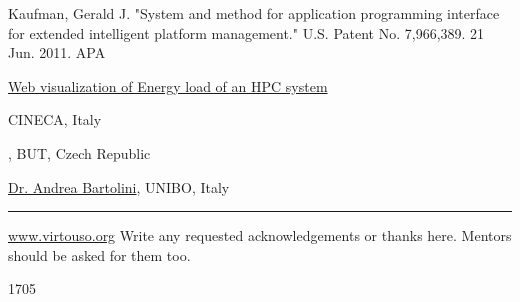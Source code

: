 \documentclass[a4paper, twoside]{article}
\begin{document}
\begin{multicols}{3}
\begin{thebibliography}{9}
Kaufman, Gerald J. "System and method for application programming interface for extended intelligent platform management." U.S. Patent No. 7,966,389. 21 Jun. 2011.
APA
\end{thebibliography}

\vfill
\noindent\begin{minipage}[b]{0.7\linewidth}
\begin{flushleft}
  \selectfont
  \href{https://summerofhpc.prace-ri.eu/web-visualization-of-energy-load-of-an-hpc-system/}{Web visualization of Energy load of an HPC system}
  
  CINECA, Italy
  
  \href{mailto:xstehl14@stud.fit.vutbr.cz}{\theauthor},
  BUT, Czech Republic
  
  \href{mailto:a.bartolini@unibo.it}{Dr. Andrea Bartolini}, UNIBO, Italy
\end{flushleft}
\end{minipage}\hfill%
\begin{minipage}[b]{0.3\linewidth}
  \color{prace-darkblue}\rule{\linewidth}{2.5cm}\par
  \tiny\theauthor
\end{minipage}%
\vspace{-1.5ex}%
\begin{flushleft}
  \href{http://www.virtouso.org}{www.virtouso.org}
  Write any requested acknowledgements or thanks here. Mentors should be
  asked for them too.

     1705
\end{flushleft}
\end{multicols}
\end{document}
